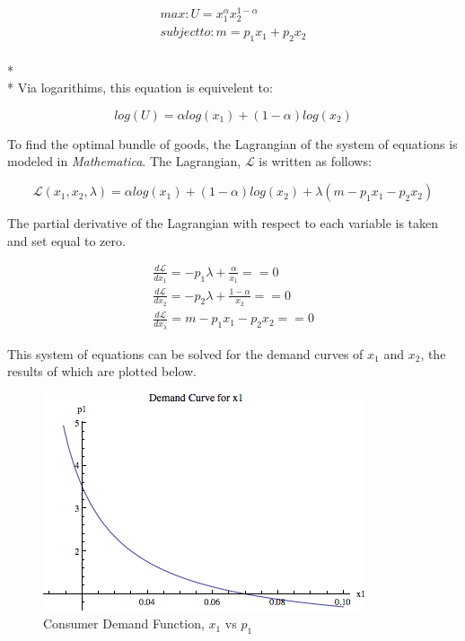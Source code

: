\documentclass{article}
\begin{document}
\begin{align}
	max: U = x_{1}^{\alpha} x_{2}^{1-\alpha} \\
	subject to: m = p_{1}x_{1} + p_{2}x_{2}
\end{align}
\\* \\*
Via logarithims, this equation is equivelent to:

\begin{equation}
	log(U) =  \alpha log(x_{1}) + (1-\alpha) log(x_{2}) 
\end{equation}

To find the optimal bundle of goods, the Lagrangian of the system of equations is modeled in \emph{Mathematica}. The Lagrangian, $\mathcal{L}$ is written as follows:

\begin{equation}
	\mathcal{L}(x_{1}, x_{2},\lambda) = \alpha log(x_{1}) + (1-\alpha) log(x_{2}) +\lambda (m - p_{1}x_{1} -p_{2}x_{2})
\end{equation}

The partial derivative of the Lagrangian with respect to each variable is taken and set equal to zero.

\begin{align}
		\frac{d\mathcal{L}}{dx_{1}} = -p_{1}\lambda + \frac{\alpha}{x_{1}} ==0 \\
		\frac{d\mathcal{L}}{dx_{2}} = -p_{2}\lambda + \frac{1-\alpha}{x_{2}} ==0 \\
		\frac{d\mathcal{L}}{dx_{\lambda}} = m - p_{1}x_{1} - p_{2}x_{2} == 0
\end{align}


This system of equations can be solved for the demand curves of $x_{1}$ and $x_{2}$, the results of which are plotted below. 

\begin{figure}[!ht]
	\begin{center}
	\includegraphics[scale=.75]{Figures/x1Demand}
	\caption{Consumer Demand Function, $x_{1}$ vs $p_{1}$}
	\end{center}
\end{figure}
\end{document}

